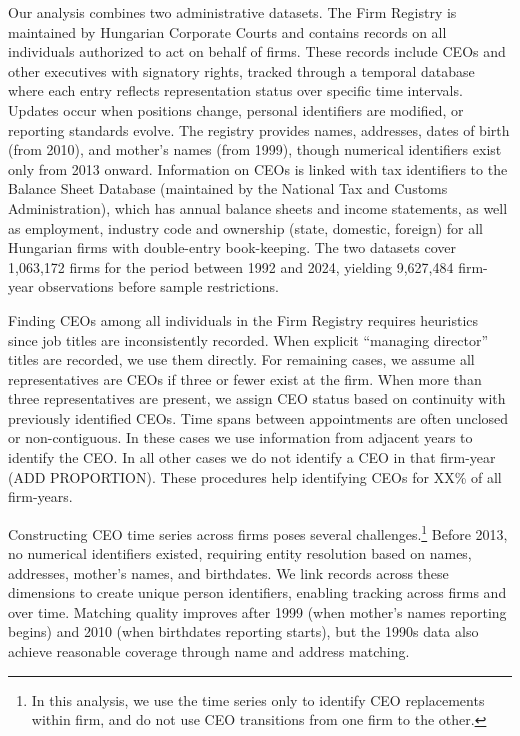 \documentclass[11pt,a4paper]{article}
\begin{document}
Our analysis combines two administrative datasets. The Firm Registry is maintained by Hungarian Corporate Courts and contains records on all individuals authorized to act on behalf of firms. These records include CEOs and other executives with signatory rights, tracked through a temporal database where each entry reflects representation status over specific time intervals. Updates occur when positions change, personal identifiers are modified, or reporting standards evolve. The registry provides names, addresses, dates of birth (from 2010), and mother’s names (from 1999), though numerical identifiers exist only from 2013 onward. Information on CEOs is linked with tax identifiers to the Balance Sheet Database (maintained by the National Tax and Customs Administration), which has annual balance sheets and income statements, as well as employment, industry code and ownership (state, domestic, foreign) for all Hungarian firms with double-entry book-keeping. The two datasets cover 1,063,172 firms for the period between 1992 and 2024, yielding 9,627,484 firm-year observations before sample restrictions.

Finding CEOs among all individuals in the Firm Registry requires heuristics since job titles are inconsistently recorded. When explicit “managing director” titles are recorded, we use them directly. For remaining cases, we assume all representatives are CEOs if three or fewer exist at the firm. When more than three representatives are present, we assign CEO status based on continuity with previously identified CEOs. Time spans between appointments are often unclosed or non-contiguous. In these cases we use information from adjacent years to identify the CEO. In all other cases we do not identify a CEO in that firm-year (ADD PROPORTION). These procedures help identifying CEOs for XX\% of all firm-years.

Constructing CEO time series across firms poses several challenges.\footnote{In this analysis, we use the time series only to identify CEO replacements within firm, and do not use CEO transitions from one firm to the other.} Before 2013, no numerical identifiers existed, requiring entity resolution based on names, addresses, mother’s names, and birthdates. We link records across these dimensions to create unique person identifiers, enabling tracking across firms and over time. Matching quality improves after 1999 (when mother’s names reporting begins) and 2010 (when birthdates reporting starts), but the 1990s data also achieve reasonable coverage through name and address matching.
\end{document}
